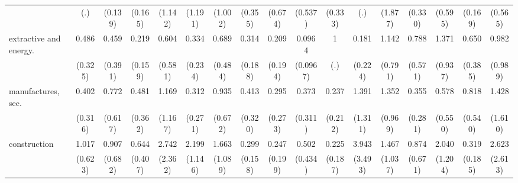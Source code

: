 {\begin{tabular}{l*{16}{c}}
                    &         (.)         &     (0.139)         &     (0.165)         &     (1.142)         &     (1.191)         &     (1.002)         &     (0.355)         &     (0.674)         &     (0.537)         &     (0.333)         &         (.)         &     (1.877)         &     (0.330)         &     (0.595)         &     (0.169)         &     (0.565)         \\
[1em]
extractive and energy.&       0.486         &       0.459         &       0.219\sym{*}  &       0.604         &       0.334         &       0.689         &       0.314         &       0.209         &      0.0964\sym{*}  &           1         &       0.181         &       1.142         &       0.788         &       1.371         &       0.650         &       0.982         \\
                    &     (0.325)         &     (0.391)         &     (0.159)         &     (0.581)         &     (0.234)         &     (0.484)         &     (0.188)         &     (0.194)         &    (0.0967)         &         (.)         &     (0.224)         &     (0.791)         &     (0.571)         &     (0.937)         &     (0.385)         &     (0.989)         \\
[1em]
manufactures, sec.  &       0.402         &       0.772         &       0.481         &       1.169         &       0.312         &       0.935         &       0.413         &       0.295         &       0.373         &       0.237         &       1.391         &       1.352         &       0.355         &       0.578         &       0.818         &       1.428         \\
                    &     (0.316)         &     (0.617)         &     (0.362)         &     (1.167)         &     (0.271)         &     (0.672)         &     (0.320)         &     (0.273)         &     (0.311)         &     (0.212)         &     (1.311)         &     (0.969)         &     (0.281)         &     (0.550)         &     (0.540)         &     (1.610)         \\
[1em]
construction        &       1.017         &       0.907         &       0.644         &       2.742         &       2.199         &       1.663         &       0.299\sym{*}  &       0.247         &       0.502         &       0.225         &       3.943         &       1.467         &       0.874         &       2.040         &       0.319\sym{*}  &       2.623         \\
                    &     (0.623)         &     (0.682)         &     (0.407)         &     (2.362)         &     (1.146)         &     (1.089)         &     (0.158)         &     (0.199)         &     (0.434)         &     (0.187)         &     (3.493)         &     (1.037)         &     (0.671)         &     (1.204)         &     (0.185)         &     (2.613)         \\

\end{tabular}}
